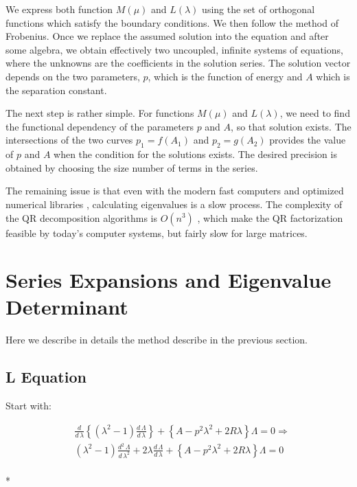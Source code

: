 We express both function $ M(\mu) $ and $ L(\lambda) $ using the set of orthogonal functions which satisfy the boundary conditions. We then follow the method of Frobenius. Once we replace the assumed solution into the equation and after some algebra, we obtain effectively two uncoupled, infinite systems of equations, where the unknowns are the coefficients in the solution series. The solution vector depends on the two parameters, $ p $, which is the function of energy and $ A $ which is the separation constant. 

The next step is rather simple. For functions $ M(\mu) $ and $ L(\lambda) $, we need to find the functional dependency of the parameters $ p $ and $ A $, so that solution exists. The intersections of the two curves $ p_1 = f(A_1) $ and $ p_2 = g(A_2) $ provides the value of $ p $ and $ A $ when the condition for the  solutions exists. The desired precision is obtained by choosing the size number of terms in the series.

The remaining issue is that even with the modern fast computers and optimized numerical libraries \cite{Lapack1}, calculating eigenvalues is a slow process. The complexity of the QR decomposition algorithms is $ O(n^3) $ \cite{QRDecomposition1}, which make the QR factorization feasible by today's computer systems, but fairly slow for large matrices.

\section{Series Expansions and Eigenvalue Determinant}

Here we describe in details the method describe in the previous section.

\subsection{L  Equation}

Start with:

\begin{equation}
\begin{split}
& \frac{d}{d\,\lambda}\left\{\left(\lambda^2-1\right)\frac{d\,\Lambda}{d\,\lambda}\right\} +
\left\{ A - p^2\lambda^2 + 2R\lambda  \right\}\Lambda = 0 \Rightarrow \\
& \left(\lambda^2-1\right)\frac{d^2\,\Lambda}{d\,\lambda^2} + 2\lambda \frac{d\,\Lambda}{d\,\lambda} + \left\{ A - p^2\lambda^2 + 2R\lambda  \right\}\Lambda = 0 
\end{split}
\end{equation}\\*

